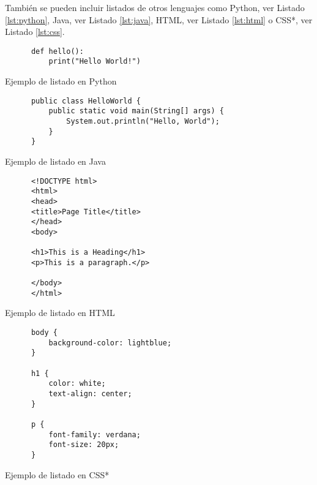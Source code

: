   También se pueden incluir listados de otros lenguajes como Python, ver Listado \ref{lst:python}, Java, ver Listado \ref{lst:java}, HTML, ver  Listado \ref{lst:html} o CSS*{}, ver Listado \ref{lst:css}.

  \begin{listing}[!htb]
    \begin{verbatim}
      def hello():
          print("Hello World!")
    \end{verbatim}
    \vspace*{-1cm}
    \captionsetup{type=lstlisting}
    \caption{Ejemplo de listado en Python}
    \label{lst:python}
  \end{listing}

  \begin{listing}[!htb]
    \begin{verbatim}
      public class HelloWorld {
          public static void main(String[] args) {
              System.out.println("Hello, World");
          }
      }
    \end{verbatim}
    \vspace*{-1cm}
    \captionsetup{type=lstlisting}
    \caption{Ejemplo de listado en Java}
    \label{lst:java}
  \end{listing}

  \begin{listing}[!htb]
    \begin{verbatim}
      <!DOCTYPE html>
      <html>
      <head>
      <title>Page Title</title>
      </head>
      <body>
      
      <h1>This is a Heading</h1>
      <p>This is a paragraph.</p>
      
      </body>
      </html>
    \end{verbatim}
    \vspace*{-1cm}
    \captionsetup{type=lstlisting}
    \caption{Ejemplo de listado en HTML}
    \label{lst:html}
  \end{listing}

  \begin{listing}[!htb]
    \begin{verbatim}
      body {
          background-color: lightblue;
      }
      
      h1 {
          color: white;
          text-align: center;
      }
      
      p {
          font-family: verdana;
          font-size: 20px;
      }
    \end{verbatim}
    \vspace*{-1cm}
    \captionsetup{type=lstlisting}
    \caption{Ejemplo de listado en CSS*{}}
    \label{lst:css}
  \end{listing}

